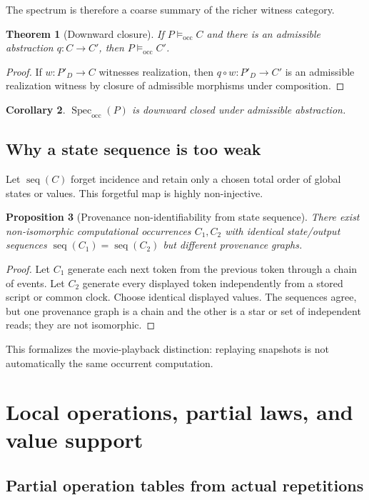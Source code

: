 \documentclass[11pt,a4paper]{article}
\theoremstyle{clean}
\newtheorem{theorem}{Theorem}[section]
\newtheorem{proposition}[theorem]{Proposition}
\newtheorem{corollary}[theorem]{Corollary}
\theoremstyle{definition}
\newcommand{\Spec}{\operatorname{Spec}}
\newcommand{\Occ}{\mathrm{occ}}
\begin{document}
The spectrum is therefore a coarse summary of the richer witness category.

\begin{theorem}[Downward closure]
If $P\models_\Occ C$ and there is an admissible abstraction $q:C\to C'$, then $P\models_\Occ C'$.
\end{theorem}
\begin{proof}
If $w:P'_D\to C$ witnesses realization, then $q\circ w:P'_D\to C'$ is an admissible realization witness by closure of admissible morphisms under composition.
\end{proof}

\begin{corollary}
$\Spec_\Occ(P)$ is downward closed under admissible abstraction.
\end{corollary}

\subsection{Why a state sequence is too weak}

Let $\operatorname{seq}(C)$ forget incidence and retain only a chosen total order of global states or values. This forgetful map is highly non-injective.

\begin{proposition}[Provenance non-identifiability from state sequence]
There exist non-isomorphic computational occurrences $C_1,C_2$ with identical state/output sequences $\operatorname{seq}(C_1)=\operatorname{seq}(C_2)$ but different provenance graphs.
\end{proposition}
\begin{proof}
Let $C_1$ generate each next token from the previous token through a chain of events. Let $C_2$ generate every displayed token independently from a stored script or common clock. Choose identical displayed values. The sequences agree, but one provenance graph is a chain and the other is a star or set of independent reads; they are not isomorphic.
\end{proof}

This formalizes the movie-playback distinction: replaying snapshots is not automatically the same occurrent computation.

\section{Local operations, partial laws, and value support}

\subsection{Partial operation tables from actual repetitions}
\end{document}
